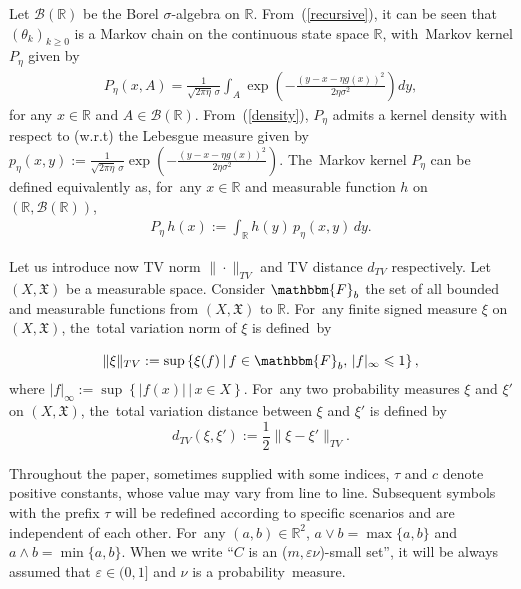 \documentclass[11pt]{elsarticle}
\def\geq{\geqslant}
\def\leq{\leqslant}
\def\R{\mathbb{R}}
\begin{document}
Let $\mathcal{B}(\R)$ be the Borel $\sigma$-algebra on $\R$. From~(\ref{recursive}), it can be seen that $(\theta_k)_{k\geq0}$ is a Markov chain on the continuous state space $\R$, with~Markov kernel $P_{\eta}$ given by
\begin{align}
	P_{\eta}(x,A)=\frac{1}{\sqrt{2\pi\eta}\,\sigma}\int_A\exp\left(-\frac{(y-x-\eta g(x))^2}{2\eta\sigma^2}\right) dy, \label{density}
\end{align}
for any $x\in\R$ and $A\in \mathcal{B}(\R)$. From~(\ref{density}), $P_{\eta}$ admits a kernel density with respect to (w.r.t) the Lebesgue measure given by $p_{\eta}(x,y):=\frac{1}{\sqrt{2\pi\eta}\,\sigma}\exp\left(-\frac{(y-x-\eta g(x))^2}{2\eta\sigma^2}\right)$. The~Markov kernel $P_\eta$ can be defined equivalently as, for~any $x\in \R$ and measurable function $h$ on $\left(\R,\mathcal{B}(\R)\right)$,
\begin{align*}
	P_{\eta}\,h(x):=\int_{\R}h(y) \,p_{\eta}(x,y)\,dy.
\end{align*}

 Let us introduce now TV norm $\|\cdot\|_{TV}$ and TV distance $d_{TV}$ respectively. Let $(X, \mathfrak{X})$ be a measurable space. Consider $\mathbbm{F}_b$ the set of all bounded and measurable functions from $(X, \mathfrak{X})$ to $\R$. For~any finite signed measure $\xi$ on $(X, \mathfrak{X})$, the~total variation norm of $\xi$ is defined~by
 
 $$\|\xi\|_{TV}:=\sup\left\{\xi(f)\,|\,f\in\mathbbm{F}_b,\,|f|_{\infty}\leq1\right\},$$
 where $|f|_{\infty}:=\sup\left\{|f(x)|\,|\,x\in X\right\}$. For~any two probability measures $\xi$ and $\xi'$ on $(X, \mathfrak{X})$, the~total variation distance between $\xi$ and $\xi'$ is defined by
 \begin{equation}\label{def_TVD}
 	d_{TV}(\xi,\xi'):=\frac{1}{2}\|\xi-\xi'\|_{TV}.
 \end{equation}

Throughout the paper, sometimes supplied with some indices, $\tau$ and $c$ denote positive constants, whose value may vary from line to line. Subsequent symbols with the prefix $\tau$ will be redefined according to specific scenarios and are independent of each other. For~any $(a,b)\in\R^2$, $a\vee b=\max\{a,b\}$ and $a\wedge b=\min\{a,b\}$. When we write ``$C$ is an ($m,\varepsilon\nu$)-small set'', it will be always assumed that $\varepsilon\in(0,1]$ and $\nu$ is a probability~measure.
\end{document}

